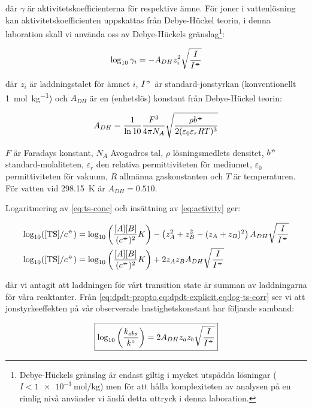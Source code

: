 där $\gamma$ är aktivitetskoefficienterna för respektive ämne. För joner
i vattenlösning kan aktivitetskoefficienten uppskattas från Debye-Hückel
teorin, i denna laboration skall vi använda oss av Debye-Hückels
gränslag\footnote{
  Debye-Hückels gränslag är endast giltig i mycket utspädda lösningar ($I
  < \SI{1e-3}{\mole\per\kg}$) men för att hålla komplexiteten av analysen
  på en rimlig nivå använder vi ändå detta uttryck i denna laboration.
}:

\begin{equation}
  \label{eq:activity}
  \log_{10}\gamma_i = -A_{DH}z_i^2\sqrt{\frac{I}{I^{-\kern-5pt{\circ}\kern-5pt-}}}
\end{equation}

där $z_i$ är laddningstalet för ämnet $i$, $I^{-\kern-5pt{\circ}\kern-5pt-}$ är
standard-jonstyrkan (konventionellt \SI{1}{\mole\per\kg}) och $A_{DH}$
är en (enhetslös) konstant från Debye-Hückel teorin:

\begin{equation}
  \label{eq:debye-huckel-a}
  A_{DH} = \frac{1}{\ln 10} \frac{F^3}{4\pi N_A}\sqrt{\frac{\rho b^{-\kern-5pt{\circ}\kern-5pt-}}{2(\varepsilon_0\varepsilon_rRT)^3}}
\end{equation}

$F$ är Faradays konstant, $N_A$ Avogadros tal, $\rho$ lösningsmedlets
densitet, $b^{{-\kern-5pt{\circ}\kern-5pt-}}$ standard-molaliteten, $\varepsilon_r$ den
relativa permittiviteten för mediumet, $\varepsilon_0$ permittiviteten för
vakuum, $R$ allmänna gaskonstanten och $T$ är temperaturen. För vatten vid
\SI{298.15}{\kelvin} är $A_{DH} = 0.510$.

Logaritmering av \cref{eq:ts-conc} och insättning av \cref{eq:activity}
ger:

\begin{align}
  \log_{10}([\ce{TS}] / c^\plimsoll) &= \log_{10}\left(
    \frac{[A][B]}{(c^\plimsoll)^2}K \right) - \left(z_A^2 + z_B^2 - (z_A+z_B)^2\right) A_{DH}
    \sqrt{\frac{I}{I^\plimsoll}} \\
  \label{eq:log-ts-corr}
  \log_{10}([\ce{TS}] / c^\plimsoll) &= \log_{10}
    \left(\frac{[A][B]}{(c^\plimsoll)^2}K
    \right) + 2z_Az_BA_{DH}\sqrt{\frac{I}{I^\plimsoll}}
\end{align}

där vi antagit att laddningen för vårt transition state är summan av
laddningarna för våra reaktanter.
Från \cref{eq:dpdt-propto,eq:dpdt-explicit,eq:log-ts-corr} ser vi att jonstyrkeeffekten
på vår observerade hastighetskonstant har följande samband:

\begin{align}
  \label{eq:kinetic-salt}
  \boxed{
  \log_{10} \left( \frac{k_{obs}}{k^{\circ}} \right) = 2A_{DH}z_az_b\sqrt{\frac{I}{I^{-\kern-5pt{\circ}\kern-5pt-}}}
  }
\end{align}

